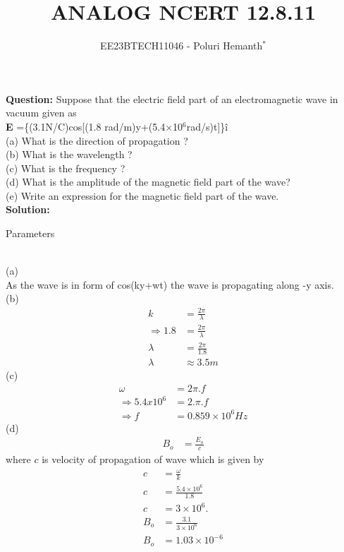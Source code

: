 \documentclass[journal,12pt,twocolumn]{IEEEtran}
\theoremstyle{remark}
\begin{document}

\vspace{3cm}

\title{ANALOG NCERT 12.8.11}
\author{EE23BTECH11046 - Poluri Hemanth$^{*}$}
\maketitle
\textbf{Question:}
Suppose that the electric field part of an electromagnetic wave
in vacuum given as\\ \textbf{E} =\{(3.1N/C)cos[(1.8 rad/m)y+(5.4$\times$10$^{6}$rad/s)t]\}\^i \\
(a) What is the direction of propagation ?\\
(b) What is the wavelength ? \\
(c) What is the frequency ?\\
(d) What is the amplitude of the magnetic field part of the wave?\\
(e) Write an expression for the magnetic field part of the wave.\\
\textbf{Solution:}
\begin{table}[h!]
    
    \caption{Parameters}
    \label{tab:12.8.11}
\end{table}\\
(a)\\
As the wave is in form of cos(ky+wt)
the wave is propagating along -y axis.\\
(b)
\begin{align}
	k&=\frac{2\pi}{\lambda} \\
	\Rightarrow 1.8&=\frac{2\pi}{\lambda}\\
	 \lambda&=\frac{2\pi}{1.8}\\
	\lambda &\approx 3.5m
\end{align}
(c)
\begin{align} 
	\omega&=2\pi.f \\
	\Rightarrow 5.4 x 10^{6} &=2.\pi.f \\
	\Rightarrow f &= 0.859 \times 10^{6} Hz    
\end{align}
(d)
\begin{align}
	B_o&=\frac{E_o}{c}
\end{align}
where $c$ is velocity of propagation of wave which is given by
\begin{align}
	c&=\frac{\omega}{k} \\
	c&=  \frac{5.4 \times 10^{6}}{1.8}\\
	c&= 3 \times 10^{6}.\\
	B_o&= \frac{3.1}{3 \times 10^{6}}\\
	B_o&= 1.03 \times 10^{-6}
\end{align}
\end{document}
